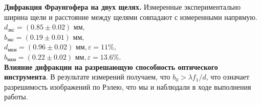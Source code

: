 \documentclass[a4paper, 12pt]{article}%
\begin{document}
 	\textbf{Дифракция Фраунгофера на двух щелях.} Измеренные экспериментально ширина щели и расстояние между щелями совпадают с измеренными напрямую.\\
 	$d_\text{экс} = (0.85 \pm 0.02) \text{ мм},$\\
 	$b_\text{экс} = (0.19 \pm 0.01) \text{ мм},$\\
 	$d_\text{мкм} = (0.96 \pm 0.02) \text{ мм}, \varepsilon = 11 \%,$\\
 	$b_\text{мкм} = (0.22 \pm 0.02) \text{ мм}, \varepsilon = 13.6 \%.$\\
 	
 	\textbf{Влияние дифракции на разрешающую способность оптического инструмента}. В результате измерений получаем, что $b_0 > \lambda f_1/d$, что означает разрешимость изображений по Рэлею, что мы и наблюдали в ходе выполнения работы.
 	
 	
 	
\end{document}
